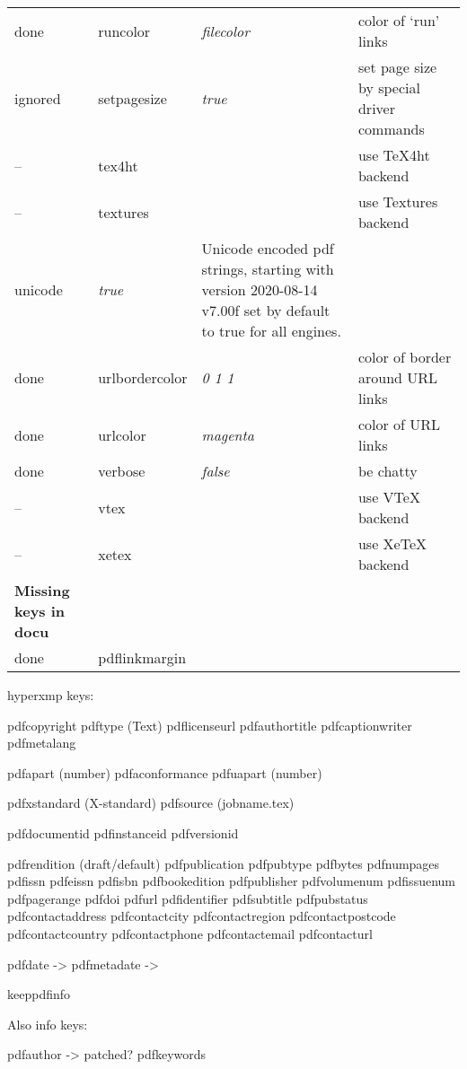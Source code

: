 \begin{longtable}{@{}l>{\ttfamily}llp{7cm}@{}}
done & runcolor           & \textit{filecolor}     & color of `run' links\\
ignored &setpagesize        & \textit{true}          & set page size by special driver commands \\
-- & tex4ht             &                        & use \textsf{\TeX4ht} backend \\
-- & textures           &                        & use \textsf{Textures} backend \\
unicode            & \textit{true}          & Unicode encoded pdf strings, starting with version  2020-08-14 v7.00f set by default to true for all engines. \\
done & urlbordercolor     & \textit{0 1 1}         & color of border around URL links \\
done & urlcolor           & \textit{magenta}       & color of URL links \\
done & verbose            & \textit{false}         & be chatty \\
-- & vtex               &                        & use \textsf{VTeX} backend\\
-- & xetex              &                        & use \textsf{Xe\TeX} backend\\
\textbf{Missing keys in docu}\\
done & pdflinkmargin    &
\end{longtable}

hyperxmp keys:

pdfcopyright
pdftype   (Text)
pdflicenseurl
pdfauthortitle
pdfcaptionwriter
pdfmetalang

pdfapart  (number)
pdfaconformance
pdfuapart (number)

pdfxstandard  (X-standard)
pdfsource (jobname.tex)

pdfdocumentid
pdfinstanceid
pdfversionid

pdfrendition (draft/default)
pdfpublication
pdfpubtype
pdfbytes
pdfnumpages
pdfissn
pdfeissn
pdfisbn
pdfbookedition
pdfpublisher
pdfvolumenum
pdfissuenum
pdfpagerange
pdfdoi
pdfurl
pdfidentifier
pdfsubtitle
pdfpubstatus
pdfcontactaddress
pdfcontactcity
pdfcontactregion
pdfcontactpostcode
pdfcontactcountry
pdfcontactphone
pdfcontactemail
pdfcontacturl

pdfdate -> \@pdfdatetime
pdfmetadate -> \@pdfmetadatetime

keeppdfinfo


Also info keys:

pdfauthor    -> patched?
pdfkeywords




